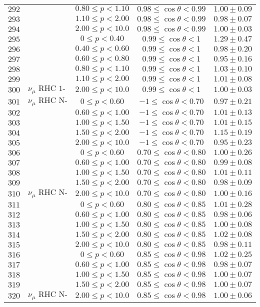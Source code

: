 \begin{longtable}[c]{ccccc}
$292$ &  & $0.80\leq p<1.10$ & $0.98\leq\cos\theta<0.99$ & $1.00\pm0.09$\tabularnewline
$293$ &  & $1.10\leq p<2.00$ & $0.98\leq\cos\theta<0.99$ & $0.98\pm0.07$\tabularnewline
$294$ &  & $2.00\leq p<10.0$ & $0.98\leq\cos\theta<0.99$ & $1.00\pm0.03$\tabularnewline
$295$ &  & $0\leq p<0.40$ & $0.99\leq\cos\theta<1$ & $1.29\pm0.47$\tabularnewline
$296$ &  & $0.40\leq p<0.60$ & $0.99\leq\cos\theta<1$ & $0.98\pm0.20$\tabularnewline
$297$ &  & $0.60\leq p<0.80$ & $0.99\leq\cos\theta<1$ & $0.95\pm0.16$\tabularnewline
$298$ &  & $0.80\leq p<1.10$ & $0.99\leq\cos\theta<1$ & $1.03\pm0.10$\tabularnewline
$299$ &  & $1.10\leq p<2.00$ & $0.99\leq\cos\theta<1$ & $1.01\pm0.08$\tabularnewline
$300$ & $\nu_{\mu}\text{ RHC 1-Trk Wtr}$ & $2.00\leq p<10.0$ & $0.99\leq\cos\theta<1$ & $1.00\pm0.03$\tabularnewline
$301$ & $\nu_{\mu}\text{ RHC N-Trks Wtr}$ & $0\leq p<0.60$ & $-1\leq\cos\theta<0.70$ & $0.97\pm0.21$\tabularnewline
$302$ &  & $0.60\leq p<1.00$ & $-1\leq\cos\theta<0.70$ & $1.01\pm0.13$\tabularnewline
$303$ &  & $1.00\leq p<1.50$ & $-1\leq\cos\theta<0.70$ & $1.01\pm0.15$\tabularnewline
$304$ &  & $1.50\leq p<2.00$ & $-1\leq\cos\theta<0.70$ & $1.15\pm0.19$\tabularnewline
$305$ &  & $2.00\leq p<10.0$ & $-1\leq\cos\theta<0.70$ & $0.95\pm0.23$\tabularnewline
$306$ &  & $0\leq p<0.60$ & $0.70\leq\cos\theta<0.80$ & $1.00\pm0.26$\tabularnewline
$307$ &  & $0.60\leq p<1.00$ & $0.70\leq\cos\theta<0.80$ & $0.99\pm0.08$\tabularnewline
$308$ &  & $1.00\leq p<1.50$ & $0.70\leq\cos\theta<0.80$ & $1.01\pm0.11$\tabularnewline
$309$ &  & $1.50\leq p<2.00$ & $0.70\leq\cos\theta<0.80$ & $0.98\pm0.09$\tabularnewline
$310$ & $\nu_{\mu}\text{ RHC N-Trks Wtr}$ & $2.00\leq p<10.0$ & $0.70\leq\cos\theta<0.80$ & $1.00\pm0.16$\tabularnewline
$311$ &  & $0\leq p<0.60$ & $0.80\leq\cos\theta<0.85$ & $1.01\pm0.28$\tabularnewline
$312$ &  & $0.60\leq p<1.00$ & $0.80\leq\cos\theta<0.85$ & $0.98\pm0.06$\tabularnewline
$313$ &  & $1.00\leq p<1.50$ & $0.80\leq\cos\theta<0.85$ & $1.00\pm0.08$\tabularnewline
$314$ &  & $1.50\leq p<2.00$ & $0.80\leq\cos\theta<0.85$ & $1.02\pm0.08$\tabularnewline
$315$ &  & $2.00\leq p<10.0$ & $0.80\leq\cos\theta<0.85$ & $0.98\pm0.11$\tabularnewline
$316$ &  & $0\leq p<0.60$ & $0.85\leq\cos\theta<0.98$ & $1.02\pm0.25$\tabularnewline
$317$ &  & $0.60\leq p<1.00$ & $0.85\leq\cos\theta<0.98$ & $0.98\pm0.07$\tabularnewline
$318$ &  & $1.00\leq p<1.50$ & $0.85\leq\cos\theta<0.98$ & $1.00\pm0.07$\tabularnewline
$319$ &  & $1.50\leq p<2.00$ & $0.85\leq\cos\theta<0.98$ & $1.00\pm0.07$\tabularnewline
$320$ & $\nu_{\mu}\text{ RHC N-Trks Wtr}$ & $2.00\leq p<10.0$ & $0.85\leq\cos\theta<0.98$ & $1.00\pm0.06$\tabularnewline

\end{longtable}

